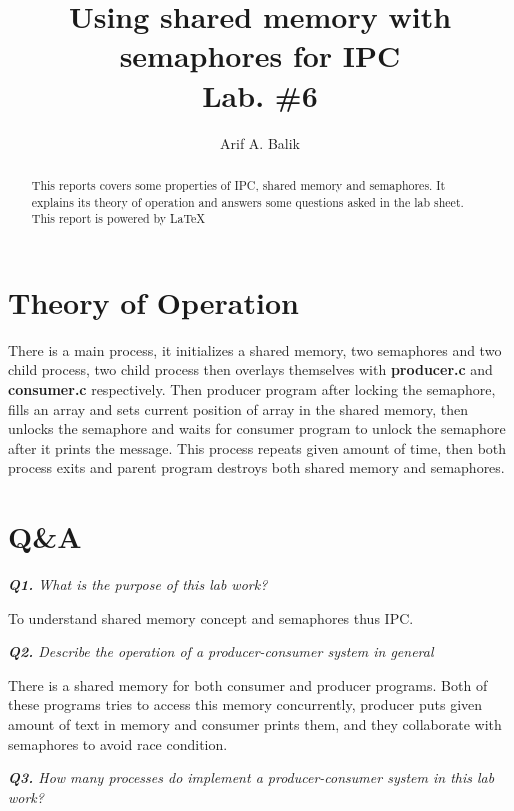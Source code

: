 \documentclass[11pt]{article}
\title{Using shared memory with semaphores for IPC \\Lab. \#6}
\author{Arif A. Balik}
\affil{Undergraduate Student\\
	Sytstems Programming\\
	Department of Computer Science\\
	Arel University\\
	Büyükçekmece, İstanbul 34537\\
    Email: arifbalik@outlook.com
}
\begin{document}
\maketitle

\begin{abstract}

This reports covers some properties of IPC, shared memory and semaphores. It explains its theory of operation and answers some questions asked in the lab sheet.
This report is powered by \LaTeX{}
\end{abstract}

\section*{Theory of Operation}

There is a main process, it initializes a shared memory, two semaphores and two child process, two child process then overlays themselves with \textbf{producer.c} and \textbf{consumer.c} respectively. Then producer program after locking the semaphore, fills an array and sets current position of array in the shared memory, then unlocks the semaphore and waits for consumer program to unlock the semaphore after it prints the message. This process repeats given amount of time, then both process exits and parent program destroys both shared memory and semaphores.

\newpage
\section*{Q\&A}

\vspace{3mm}
\textit{\textbf{Q1.} What is the purpose of this lab work?}
\vspace{3mm}

To understand shared memory concept and semaphores thus IPC.

\vspace{3mm}
\textit{\textbf{Q2.} Describe the operation of a producer-consumer system in general }
\vspace{3mm}

There is a shared memory for both consumer and producer programs. Both of these programs tries to access this memory concurrently, producer puts given amount of text in memory and consumer prints them, and they collaborate with semaphores to avoid race condition. 


\vspace{5mm}
\textit{\textbf{Q3.} How many processes do implement a producer-consumer system in this lab work?}
\vspace{5mm}
\end{document}
